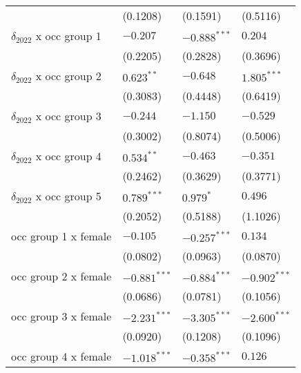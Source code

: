 \begin{tabular}{llll}
                                       &           (0.1208) &           (0.1591) &           (0.5116) \\
$\delta_{2022}$ x occ group 1          &           $-0.207$ &     $-0.888^{***}$ &            $0.204$ \\
                                       &           (0.2205) &           (0.2828) &           (0.3696) \\
$\delta_{2022}$ x occ group 2          &       $0.623^{**}$ &           $-0.648$ &      $1.805^{***}$ \\
                                       &           (0.3083) &           (0.4448) &           (0.6419) \\
$\delta_{2022}$ x occ group 3          &           $-0.244$ &           $-1.150$ &           $-0.529$ \\
                                       &           (0.3002) &           (0.8074) &           (0.5006) \\
$\delta_{2022}$ x occ group 4          &       $0.534^{**}$ &           $-0.463$ &           $-0.351$ \\
                                       &           (0.2462) &           (0.3629) &           (0.3771) \\
$\delta_{2022}$ x occ group 5          &      $0.789^{***}$ &          $0.979^*$ &            $0.496$ \\
                                       &           (0.2052) &           (0.5188) &           (1.1026) \\
occ group 1 x female                   &           $-0.105$ &     $-0.257^{***}$ &            $0.134$ \\
                                       &           (0.0802) &           (0.0963) &           (0.0870) \\
occ group 2 x female                   &     $-0.881^{***}$ &     $-0.884^{***}$ &     $-0.902^{***}$ \\
                                       &           (0.0686) &           (0.0781) &           (0.1056) \\
occ group 3 x female                   &     $-2.231^{***}$ &     $-3.305^{***}$ &     $-2.600^{***}$ \\
                                       &           (0.0920) &           (0.1208) &           (0.1096) \\
occ group 4 x female                   &     $-1.018^{***}$ &     $-0.358^{***}$ &            $0.126$ \\

\end{tabular}
